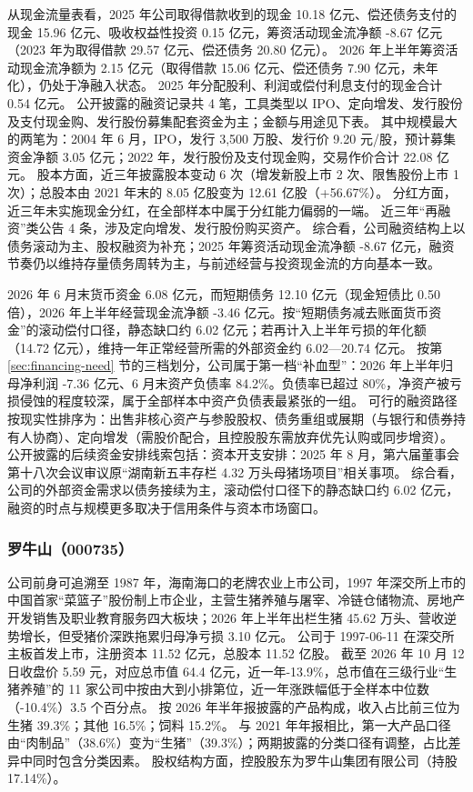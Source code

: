  从现金流量表看，2025 年公司取得借款收到的现金 10.18 亿元、偿还债务支付的现金 15.96 亿元、吸收权益性投资 0.15 亿元，筹资活动现金流净额 -8.67 亿元（2023 年为取得借款 29.57 亿元、偿还债务 20.80 亿元）。 2026 年上半年筹资活动现金流净额为 2.15 亿元（取得借款 15.06 亿元、偿还债务 7.90 亿元，未年化），仍处于净融入状态。 2025 年分配股利、利润或偿付利息支付的现金合计 0.54 亿元。 公开披露的融资记录共 4 笔，工具类型以 IPO、定向增发、发行股份及支付现金购、发行股份募集配套资金为主；金额与用途见下表。 其中规模最大的两笔为：2004 年 6 月，IPO，发行 3,500 万股、发行价 9.20 元/股，预计募集资金净额 3.05 亿元；2022 年，发行股份及支付现金购，交易作价合计 22.08 亿元。 股本方面，近三年披露股本变动 6 次（增发新股上市 2 次、限售股份上市 1 次）；总股本由 2021 年末的 8.05 亿股变为 12.61 亿股（+56.67\%）。 分红方面，近三年未实施现金分红，在全部样本中属于分红能力偏弱的一端。 近三年“再融资”类公告 4 条，涉及定向增发、发行股份购买资产。 综合看，公司融资结构上以债务滚动为主、股权融资为补充；2025 年筹资活动现金流净额 -8.67 亿元，融资节奏仍以维持存量债务周转为主，与前述经营与投资现金流的方向基本一致。

 2026 年 6 月末货币资金 6.08 亿元，而短期债务 12.10 亿元（现金短债比 0.50 倍），2026 年上半年经营现金流净额 -3.46 亿元。按“短期债务减去账面货币资金”的滚动偿付口径，静态缺口约 6.02 亿元；若再计入上半年亏损的年化额（14.72 亿元），维持一年正常经营所需的外部资金约 6.02---20.74 亿元。 按第 \ref{sec:financing-need} 节的三档划分，公司属于第一档“补血型”：2026 年上半年归母净利润 -7.36 亿元、6 月末资产负债率 84.2\%。负债率已超过 80\%，净资产被亏损侵蚀的程度较深，属于全部样本中资产负债表最紧张的一组。 可行的融资路径按现实性排序为：出售非核心资产与参股股权、债务重组或展期（与银行和债券持有人协商）、定向增发（需股价配合，且控股股东需放弃优先认购或同步增资）。 公开披露的后续资金安排线索包括：资本开支安排：2025 年 8 月，第六届董事会第十八次会议审议原“湖南新五丰存栏 4.32 万头母猪场项目”相关事项。 综合看，公司的外部资金需求以债务接续为主，滚动偿付口径下的静态缺口约 6.02 亿元，融资的时点与规模更多取决于信用条件与资本市场窗口。




\subsubsection{罗牛山（000735）}
\label{co:000735}

 公司前身可追溯至 1987 年，海南海口的老牌农业上市公司，1997 年深交所上市的中国首家“菜篮子”股份制上市企业，主营生猪养殖与屠宰、冷链仓储物流、房地产开发销售及职业教育服务四大板块；2026 年上半年出栏生猪 45.62 万头、营收逆势增长，但受猪价深跌拖累归母净亏损 3.10 亿元。 公司于 1997-06-11 在深交所主板首发上市，注册资本 11.52 亿元，总股本 11.52 亿股。 截至 2026 年 10 月 12 日收盘价 5.59 元，对应总市值 64.4 亿元，近一年-13.9\%，总市值在三级行业“生猪养殖”的 11 家公司中按由大到小排第位，近一年涨跌幅低于全样本中位数（-10.4\%）3.5 个百分点。 按 2026 年半年报披露的产品构成，收入占比前三位为生猪 39.3\%；其他 16.5\%；饲料 15.2\%。 与 2021 年年报相比，第一大产品口径由“肉制品”（38.6\%）变为“生猪”（39.3\%）；两期披露的分类口径有调整，占比差异中同时包含分类因素。 股权结构方面，控股股东为罗牛山集团有限公司（持股 17.14\%）。

